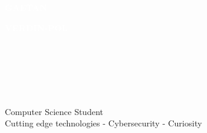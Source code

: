 \documentclass[9pt]{developercv} %
\begin{document}

\begin{minipage}[t]{0.45\textwidth} %
	\vspace{-\baselineskip} %
	
	\colorbox{coolblack}{{\huge\textcolor{white}{\textbf{\MakeUppercase{Gaetan}}}}} 
	
	\colorbox{coolblack}{{\huge\textcolor{white}{\textbf{\MakeUppercase{Verdin-Pol}}}}} 
	
	\vspace{6pt}
	

\end{minipage}
\begin{minipage}[t]{0.275\textwidth} 
	\vspace{-\baselineskip} %
	
	\\
	\\
\end{minipage}
\begin{minipage}[t]{0.375\textwidth} 
	\vspace{-\baselineskip} %
	
	\\	
	\\
\end{minipage}

{\huge Computer Science Student}\\
{\large Cutting edge technologies - Cybersecurity - Curiosity}
	
\vspace{0.5cm}
\end{document}
